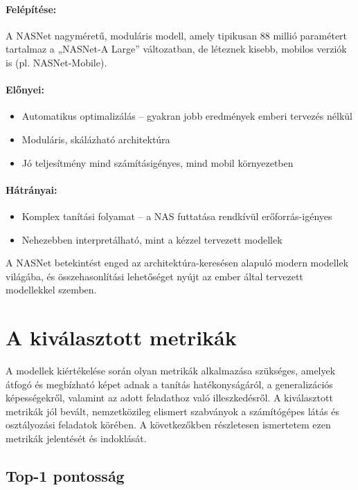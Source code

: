 \paragraph{Felépítése:} A NASNet nagyméretű, moduláris modell, amely tipikusan 88 millió paramétert tartalmaz a „NASNet-A Large” változatban, de léteznek kisebb, mobilos verziók is (pl. NASNet-Mobile).

\paragraph{Előnyei:}
\begin{itemize}
    \item Automatikus optimalizálás – gyakran jobb eredmények emberi tervezés nélkül
    \item Moduláris, skálázható architektúra
    \item Jó teljesítmény mind számításigényes, mind mobil környezetben
\end{itemize}

\paragraph{Hátrányai:}
\begin{itemize}
    \item Komplex tanítási folyamat – a NAS futtatása rendkívül erőforrás-igényes
    \item Nehezebben interpretálható, mint a kézzel tervezett modellek
\end{itemize}

A NASNet betekintést enged az architektúra-keresésen alapuló modern modellek világába, és összehasonlítási lehetőséget nyújt az ember által tervezett modellekkel szemben.


\section{A kiválasztott metrikák}

A modellek kiértékelése során olyan metrikák alkalmazása szükséges, amelyek átfogó és megbízható képet adnak a tanítás hatékonyságáról, a generalizációs képességekről, valamint az adott feladathoz való illeszkedésről. A kiválasztott metrikák jól bevált, nemzetközileg elismert szabványok a számítógépes látás és osztályozási feladatok körében. A következőkben részletesen ismertetem ezen metrikák jelentését és indoklását.

\subsection{Top-1 pontosság}


